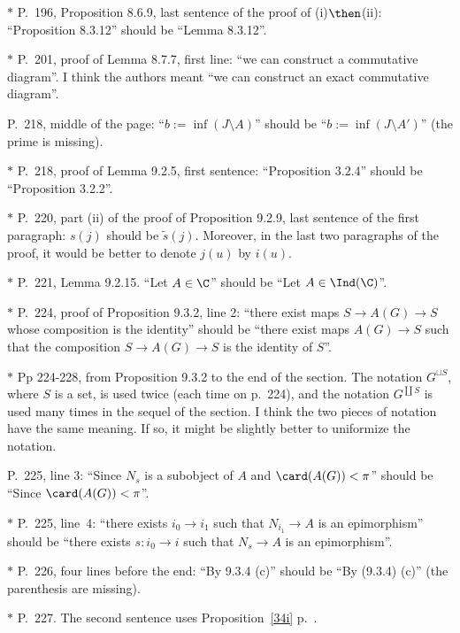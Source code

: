 \documentclass[12pt]{article}
\theoremstyle{remark}
\theoremstyle{definition}
\begin{document}
\nn$*$ P.~196, Proposition 8.6.9, last sentence of the proof of (i)$\then$(ii): ``Proposition 8.3.12'' should be ``Lemma 8.3.12''.

\nn$*$ P.~201, proof of Lemma 8.7.7, first line: ``we can construct a commutative diagram''. I think the authors meant ``we can construct an exact commutative diagram''.

\begin{s}
P.~218, middle of the page: ``$b:=\inf(J\setminus A)$'' should be ``$b:=\inf(J\setminus A')$'' (the prime is missing).
\end{s}

\nn$*$ P.~218, proof of Lemma 9.2.5, first sentence: ``Proposition 3.2.4'' should be ``Proposition 3.2.2''. 

\nn$*$ P.~220, part (ii) of the proof of Proposition 9.2.9, last sentence of the first paragraph: $s(j)$ should be $\tilde s(j)$. Moreover, in the last two paragraphs of the proof, it would be better to denote $j(u)$ by $i(u)$. 

\nn$*$ P.~221, Lemma 9.2.15. ``Let $A\in\C$'' should be ``Let $A\in\Ind(\C)$''.

\nn$*$ P.~224, proof of Proposition 9.3.2, line 2: ``there exist maps $S\to A(G)\to S$ whose composition is the identity'' should be ``there exist maps $A(G)\to S$ such that the composition $S\to A(G)\to S$ is the identity of $S$''.

\nn$*$ Pp 224-228, from Proposition 9.3.2 to the end of the section. The notation $G^{\sqcup S}$, where $S$ is a set, is used twice (each time on p.~224), and the notation $G^{\coprod S}$ is used many times in the sequel of the section. I think the two pieces of notation have the same meaning. If so, it might be slightly better to uniformize the notation.

\begin{s}
P.~225, line 3: ``Since $N_s$ is a subobject of $A$ and $\card(A(G))<\pi$'' should be ``Since $\card(A(G))<\pi$''.

\nn$*$ P.~225, line~4: ``there exists $i_0\to i_1$ such that $N_{i_1}\to A$ is an epimorphism'' should be ``there exists $s:i_0\to i$ such that $N_s\to A$ is an epimorphism''.
\end{s}

\nn$*$ P.~226, four lines before the end: ``By 9.3.4 (c)'' should be ``By (9.3.4) (c)'' (the parenthesis are missing).

\nn$*$ P.~227. The second sentence uses Proposition~\ref{34i} p.~.
\end{document}
